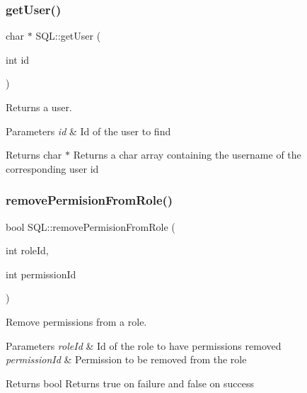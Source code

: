 \subsubsection{\texorpdfstring{get\+User()}{getUser()}\hspace{0.1cm}{\footnotesize\ttfamily [2/2]}}
{\footnotesize\ttfamily char $\ast$ S\+Q\+L\+::get\+User (\begin{DoxyParamCaption}\item[{int}]{id }\end{DoxyParamCaption})}



Returns a user. 


\begin{DoxyParams}{Parameters}
{\em id} & Id of the user to find \\
\hline
\end{DoxyParams}
\begin{DoxyReturn}{Returns}
{\ttfamily char $\ast$} Returns a char array containing the username of the corresponding user id 
\end{DoxyReturn}
\mbox{\label{class_s_q_l_a2254fe795d047f09cf1228b5a59591af}} 
\subsubsection{\texorpdfstring{remove\+Permision\+From\+Role()}{removePermisionFromRole()}}
{\footnotesize\ttfamily bool S\+Q\+L\+::remove\+Permision\+From\+Role (\begin{DoxyParamCaption}\item[{int}]{role\+Id,  }\item[{int}]{permission\+Id }\end{DoxyParamCaption})}



Remove permissions from a role. 


\begin{DoxyParams}{Parameters}
{\em role\+Id} & Id of the role to have permissions removed \\
\hline
{\em permission\+Id} & Permission to be removed from the role \\
\hline
\end{DoxyParams}
\begin{DoxyReturn}{Returns}
{\ttfamily bool} Returns true on failure and false on success 
\end{DoxyReturn}
\mbox{\label{class_s_q_l_aa3d785796f5fec9fb655a5384573eacb}} 
